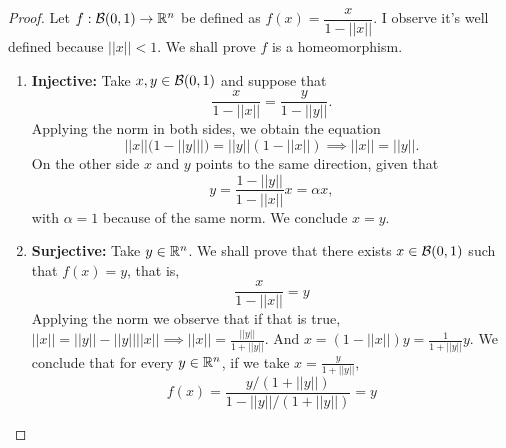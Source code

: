 \begin{proof}

Let $f: \mathcal{B}(0,1) \to \mathbb{R}^n$ be defined as $f(x) = \dfrac{x}{1 - ||x||}$. I
observe it's well defined because $||x|| < 1$. We shall prove $f$ is a
homeomorphism. 
\begin{enumerate}
    \item \textbf{Injective:} Take $x, y \in \mathcal{B}(0,1)$ and suppose that  
    $$
    \frac{x}{1 - ||x||} = \frac{y}{1 - ||y||}. 
    $$
    Applying the norm in both sides, we obtain the equation 
    $$||x||(1 - ||y|||) = ||y||(1 - ||x||) \implies ||x|| = ||y||.$$
    On the other side $x$ and $y$ points to the same direction, given that 
    $$
    y = \frac{1 - ||y||}{1 - ||x||}x = \alpha x, 
    $$
    with $\alpha = 1$ because of the same norm. We conclude $x = y$. 

    \item \textbf{Surjective:} Take $y \in \mathbb{R}^n$. We shall prove that there
    exists $x \in \mathcal{B}(0,1)$ such that $f(x) = y$, that is, 
    $$
    \frac{x}{1 - ||x||} = y
    $$
    Applying the norm we observe that if that is true, $||x|| = ||y|| -
    ||y||||x|| \implies ||x|| = \frac{||y||}{1 + ||y||}$. And $x = (1 -
    ||x||)y = \frac{1}{1 + ||y||}y$. We conclude that for every $y \in \mathbb{R}^n$,
    if we take $x = \frac{y}{1 + ||y||}$,
    $$
    f(x) = \frac{y/(1 + ||y||)}{1 - ||y||/(1 + ||y||)} = y
    $$


\end{enumerate}
\end{proof}
